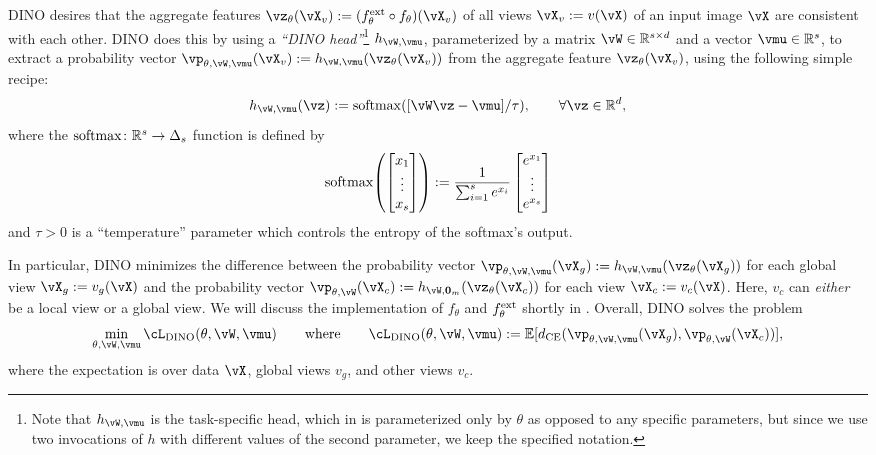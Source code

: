 \documentclass[../../book-main.tex]{subfiles}
\begin{document}
DINO desires that the aggregate features \(\vz_{\theta}(\vX_{v}) := (f_{\theta}^{\ext} \circ f_{\theta})(\vX_{v})\) of all views \(\vX_{v} := v(\vX)\) of an input image \(\vX\) are consistent with each other. DINO does this by using a \textit{``DINO head''}\footnote{Note that \(h_{\vW, \vmu}\) is the task-specific head, which in  is parameterized only by \(\theta\) as opposed to any specific parameters, but since we use two invocations of \(h\) with different values of the second parameter, we keep the specified notation.} \(h_{\vW, \vmu}\), parameterized by a matrix \(\vW \in \R^{s \times d}\) and a vector \(\vmu \in \R^{s}\), to extract a probability vector \(\vp_{\theta, \vW, \vmu}(\vX_{v}) := h_{\vW, \vmu}(\vz_{\theta}(\vX_{v}))\) from the aggregate feature \(\vz_{\theta}(\vX_{v})\), using the following simple recipe:
\begin{equation}
    h_{\vW, \vmu}(\vz) := \softmax([\vW\vz - \vmu]/\tau), \qquad \forall \vz \in \R^{d},
\end{equation}
where the \(\operatorname{\mathrm{softmax}} \colon \mathbb{R}^{s} \to \Delta_{s}\) function is defined by 
\begin{equation}
    \softmax\rp{\mat{x_{1} \\ \vdots \\ x_{s}}} := \frac{1}{\sum_{i = 1}^{s}e^{x_{i}}}\mat{e^{x_{1}} \\ \vdots \\ e^{x_{s}}}
\end{equation}
and \(\tau > 0\) is a ``temperature'' parameter which controls the entropy of the softmax's output.

In particular, DINO minimizes the difference between the probability vector \(\vp_{\theta, \vW, \vmu}(\vX_{g}) := h_{\vW, \vmu}(\vz_{\theta}(\vX_{g}))\) for each global view \(\vX_{g} := v_{g}(\vX)\) and the probability vector \(\vp_{\theta, \vW}(\vX_{c}) := h_{\vW, \vzero_{m}}(\vz_{\theta}(\vX_{c}))\) for each view \(\vX_{c} := v_{c}(\vX)\). Here, \(v_{c}\) can \textit{either} be a local view or a global view. We will discuss the implementation of \(f_{\theta}\) and \(f_{\theta}^{\mathrm{ext}}\) shortly in . Overall, DINO solves the problem
 \begin{equation}\label{eq:dino_loss}
     \min_{\theta, \vW, \vmu}\cL_{\dino}(\theta, \vW, \vmu) \qquad \text{where} \qquad \cL_{\dino}(\theta, \vW, \vmu) := \Ex[d_{\CE}(\vp_{\theta, \vW, \vmu}(\vX_{g}), \vp_{\theta, \vW}(\vX_{c}))],
\end{equation}
where the expectation is over data \(\vX\), global views \(v_{g}\), and other views \(v_{c}\).
\end{document}
